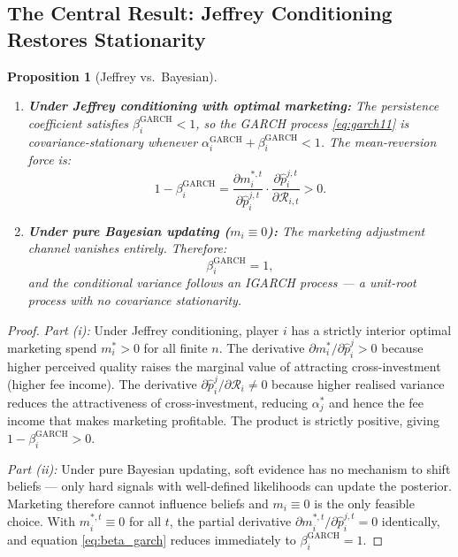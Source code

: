 \documentclass[12pt,a4paper]{article}
\newtheorem{proposition}{Proposition}
\newcommand{\1}{\mathbf{1}}
\begin{document}
\subsection{The Central Result: Jeffrey Conditioning Restores Stationarity}

\begin{proposition}[Jeffrey vs.\ Bayesian]
\label{prop:comparison}
\begin{enumerate}[label=(\roman*)]
  \item \textbf{Under Jeffrey conditioning with optimal marketing:}
  The persistence coefficient satisfies $\beta_i^{\mathrm{GARCH}} < 1$,
  so the GARCH process \eqref{eq:garch11} is covariance-stationary
  whenever $\alpha_i^{\mathrm{GARCH}} + \beta_i^{\mathrm{GARCH}} < 1$.
  The mean-reversion force is:
  \begin{equation}
    1 - \beta_i^{\mathrm{GARCH}}
    = \frac{\partial m_i^{*,t}}{\partial\hat{p}_i^{j,t}}
      \cdot
      \frac{\partial\hat{p}_i^{j,t}}{\partial\mathcal{R}_{i,t}}
    > 0.
    \label{eq:mean_reversion}
  \end{equation}

  \item \textbf{Under pure Bayesian updating ($m_i \equiv 0$):}
  The marketing adjustment channel vanishes entirely. Therefore:
  \begin{equation}
    \beta_i^{\mathrm{GARCH}} = 1,
    \label{eq:unit_root}
  \end{equation}
  and the conditional variance follows an IGARCH process --- a
  unit-root process with no covariance stationarity.
\end{enumerate}
\end{proposition}

\begin{proof}
\textit{Part (i):} Under Jeffrey conditioning, player $i$ has a
strictly interior optimal marketing spend $m_i^* > 0$ for all
finite $n$. The derivative $\partial m_i^*/\partial\hat{p}_i^j > 0$
because higher perceived quality raises the marginal value of
attracting cross-investment (higher fee income). The derivative
$\partial\hat{p}_i^j/\partial\mathcal{R}_i \neq 0$ because higher
realised variance reduces the attractiveness of cross-investment,
reducing $\alpha_j^*$ and hence the fee income that makes marketing
profitable. The product is strictly positive, giving
$1 - \beta_i^{\mathrm{GARCH}} > 0$.

\textit{Part (ii):} Under pure Bayesian updating, soft evidence has
no mechanism to shift beliefs --- only hard signals with
well-defined likelihoods can update the posterior. Marketing
therefore cannot influence beliefs and $m_i \equiv 0$ is the only
feasible choice. With $m_i^{*,t} \equiv 0$ for all $t$, the partial
derivative $\partial m_i^{*,t}/\partial\hat{p}_i^{j,t} = 0$
identically, and equation \eqref{eq:beta_garch} reduces immediately
to $\beta_i^{\mathrm{GARCH}} = 1$.
\end{proof}
\end{document}
